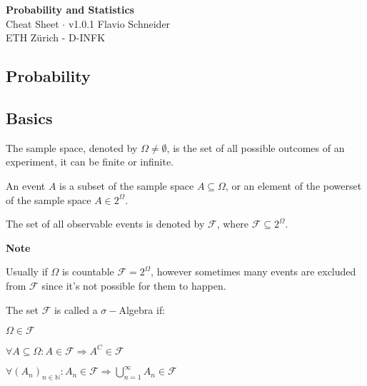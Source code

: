 \documentclass[8pt,a4paper]{extarticle}     %
\newcommand{\N}{\mathbb{N}}
\begin{document}
\begin{titlepage}
    \begin{center}
		\vspace*{1cm} \Huge \textbf{Probability and Statistics}
		\vspace{0.5cm} \Large \\  Cheat Sheet $\cdot$ v1.0.1
		\vfill Flavio Schneider 
		\vspace{0.5cm} \\ ETH Zürich - D-INFK        
    \end{center}
\end{titlepage}

\begin{multicols}{4}
\section{Probability} 
\subsection{Basics}
\begin{boxdefinition} 
	The sample space, denoted by $\Omega\neq\emptyset$, is the set of all possible outcomes of an experiment, it can be finite or infinite. 
\end{boxdefinition}
\begin{boxdefinition}[Event] 
	An event $A$ is a subset of the sample space $A\subseteq\Omega$, or an element of the powerset of the sample space $A\in 2^{\Omega}$. 
\end{boxdefinition}
\begin{boxdefinition} 
	The set of all observable events is denoted by $\mathcal{F}$, where $\mathcal{F}\subseteq 2^{\Omega}$. 
\end{boxdefinition}
\begin{listb}
	\item [] \textbf{Note}
	\item Usually if $\Omega$ is countable $\mathcal{F}=2^\Omega$, however sometimes many events are excluded from $\mathcal{F}$ since it's not possible for them to happen.
\end{listb}
\begin{boxdefinition} 
	The set $\mathcal{F}$ is called a $\sigma-$Algebra if:
	\begin{listnr}
		\item $\Omega\in\mathcal{F}$
		\item $\forall A\subseteq\Omega: A\in\mathcal{F} \Rightarrow A^C\in\mathcal{F}$
		\item $\forall (A_n)_{n\in\N}: A_n\in\mathcal{F} \Rightarrow \bigcup_{n=1}^\infty A_n\in\mathcal{F}$
	\end{listnr}
\end{boxdefinition}


\end{multicols}
\end{document}
